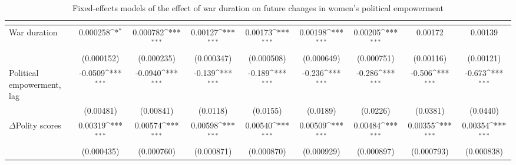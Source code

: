 \begin{table}[htbp]\centering
\def\sym#1{\ifmmode^{#1}\else\(^{#1}\)\fi}
\caption{Fixed-effects models of the effect of war duration on future changes in women's political empowerment\label{polwardur}}
\begin{tabular}{l*{8}{c}}
\hline\hline
                    &&&&&&&&\\
\hline
War duration             &    0.000258\sym{*}  &    0.000782\sym{***}&     0.00127\sym{***}&     0.00173\sym{***}&     0.00198\sym{***}&     0.00205\sym{***}&     0.00172         &     0.00139         \\
                    &  (0.000152)         &  (0.000235)         &  (0.000347)         &  (0.000508)         &  (0.000649)         &  (0.000751)         &   (0.00116)         &   (0.00121)         \\
[1em]
Political empowerment, lag  &     -0.0509\sym{***}&     -0.0940\sym{***}&      -0.139\sym{***}&      -0.189\sym{***}&      -0.236\sym{***}&      -0.286\sym{***}&      -0.506\sym{***}&      -0.673\sym{***}\\
                    &   (0.00481)         &   (0.00841)         &    (0.0118)         &    (0.0155)         &    (0.0189)         &    (0.0226)         &    (0.0381)         &    (0.0440)         \\
[1em]
$\Delta$Polity scores            &     0.00319\sym{***}&     0.00574\sym{***}&     0.00598\sym{***}&     0.00540\sym{***}&     0.00509\sym{***}&     0.00484\sym{***}&     0.00355\sym{***}&     0.00354\sym{***}\\
                    &  (0.000435)         &  (0.000760)         &  (0.000871)         &  (0.000870)         &  (0.000929)         &  (0.000897)         &  (0.000793)         &  (0.000838)         \\

\end{tabular}
\end{table}
